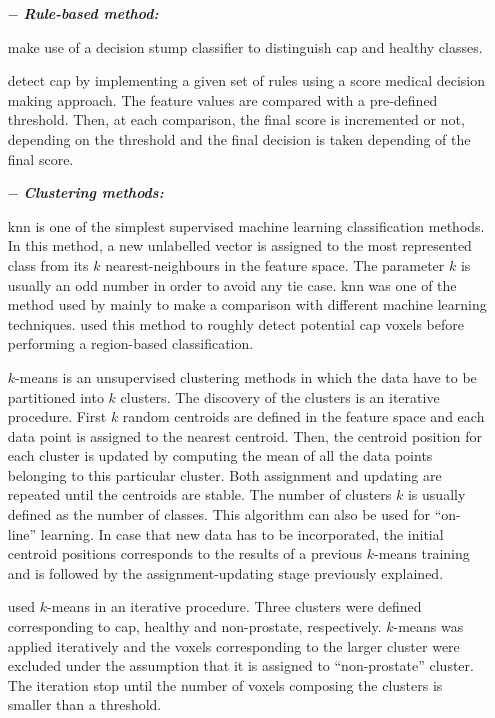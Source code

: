 \begin{enumerate}[leftmargin=*]

\item[$-$] \textbf{\textit{Rule-based method:}}

\cite{Lv2009} make use of a decision stump classifier to distinguish \ac{cap} and healthy classes. 

\cite{Puech2009} detect \ac{cap} by implementing a given set of rules using a score medical decision making approach. The feature values are compared with a pre-defined threshold. Then, at each comparison, the final score is incremented or not, depending on the threshold and the final decision is taken depending of the final score.

\item[$-$] \textbf{\textit{Clustering methods:}} 

\acf{knn} is one of the simplest supervised machine learning classification methods. In this method, a new unlabelled vector is assigned to the most represented class from its $k$ nearest-neighbours in the feature space. The parameter $k$ is usually an odd number in order to avoid any tie case. \ac{knn} was one of the method used by \cite{Niaf2011,Niaf2012} mainly to make a comparison with different machine learning techniques. \cite{Litjens2012} used this method to roughly detect potential \ac{cap} voxels before performing a region-based classification.

$k$-means is an unsupervised clustering methods in which the data have to be partitioned into $k$ clusters. The discovery of the clusters is an iterative procedure. First $k$ random centroids are defined in the feature space and each data point is assigned to the nearest centroid. Then, the centroid position for each cluster is updated by computing the mean of all the data points belonging to this particular cluster. Both assignment and updating are repeated until the centroids are stable. The number of clusters $k$ is usually defined as the number of classes. This algorithm can also be used for ``on-line'' learning. In case that new data has to be incorporated, the initial centroid positions corresponds to the results of a previous $k$-means training and is followed by the assignment-updating stage previously explained.

\cite{Tiwari2007,Tiwari2009} used $k$-means in an iterative procedure. Three clusters were defined corresponding to \ac{cap}, healthy and non-prostate, respectively. $k$-means was applied iteratively and the voxels corresponding to the larger cluster were excluded under the assumption that it is assigned to ``non-prostate'' cluster. The iteration stop until the number of voxels composing the clusters is smaller than a threshold.


\end{enumerate}
